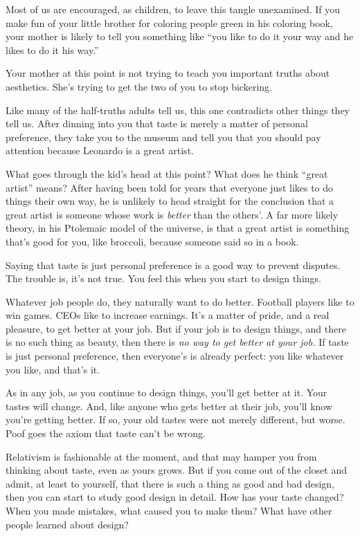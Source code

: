 \documentclass[12pt]{book}
\begin{document}
Most of us are encouraged, as children, to leave this tangle unexamined.
If you make fun of your little brother for coloring people green in his
coloring book, your mother is likely to tell you something like ``you
like to do it your way and he likes to do it his way.''

Your mother at this point is not trying to teach you important truths
about aesthetics. She's trying to get the two of you to stop bickering.

Like many of the half-truths adults tell us, this one contradicts other
things they tell us. After dinning into you that taste is merely a
matter of personal preference, they take you to the museum and tell you
that you should pay attention because Leonardo is a great artist.

What goes through the kid's head at this point? What does he think
``great artist'' means? After having been told for years that everyone
just likes to do things their own way, he is unlikely to head straight
for the conclusion that a great artist is someone whose work is
\emph{better} than the others'. A far more likely theory, in his
Ptolemaic model of the universe, is that a great artist is something
that's good for you, like broccoli, because someone said so in a book.

Saying that taste is just personal preference is a good way to prevent
disputes. The trouble is, it's not true. You feel this when you start to
design things.

Whatever job people do, they naturally want to do better. Football
players like to win games. CEOs like to increase earnings. It's a matter
of pride, and a real pleasure, to get better at your job. But if your
job is to design things, and there is no such thing as beauty, then
there is \emph{no way to get better at your job.} If taste is just
personal preference, then everyone's is already perfect: you like
whatever you like, and that's it.

As in any job, as you continue to design things, you'll get better at
it. Your tastes will change. And, like anyone who gets better at their
job, you'll know you're getting better. If so, your old tastes were not
merely different, but worse. Poof goes the axiom that taste can't be
wrong.

Relativism is fashionable at the moment, and that may hamper you from
thinking about taste, even as yours grows. But if you come out of the
closet and admit, at least to yourself, that there is such a thing as
good and bad design, then you can start to study good design in detail.
How has your taste changed? When you made mistakes, what caused you to
make them? What have other people learned about design?
\end{document}
